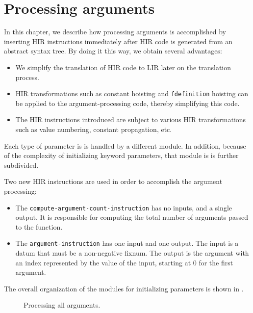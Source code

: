 \chapter{Processing arguments}

In this chapter, we describe how processing arguments is accomplished
by inserting HIR instructions immediately after HIR code is generated
from an abstract syntax tree.  By doing it this way, we obtain several
advantages:

\begin{itemize}
\item We simplify the translation of HIR code to LIR later on the
  translation process.
\item HIR transformations such as constant hoisting and
  \texttt{fdefinition} hoisting can be applied to the
  argument-processing code, thereby simplifying this code.
\item The HIR instructions introduced are subject to various HIR
  transformations such as value numbering, constant propagation,
  etc.
\end{itemize}

Each type of parameter is is handled by a different module.  In
addition, because of the complexity of initializing keyword
parameters, that module is is further subdivided.

Two new HIR instructions are used in order to accomplish the argument
processing:

\begin{itemize}
\item The \texttt{compute-argument-count-instruction} has no inputs,
  and a single output.  It is responsible for computing the total
  number of arguments passed to the function.
\item The \texttt{argument-instruction} has one input and one output.
  The input is a datum that must be a non-negative fixnum.  The output
  is the argument with an index represented by the value of the input,
  starting at $0$ for the first argument.
\end{itemize}

The overall organization of the modules for initializing parameters is
shown in .

\begin{figure}
\begin{center}
\end{center}
\caption{\label{fig-process-arguments}
Processing all arguments.}
\end{figure}

